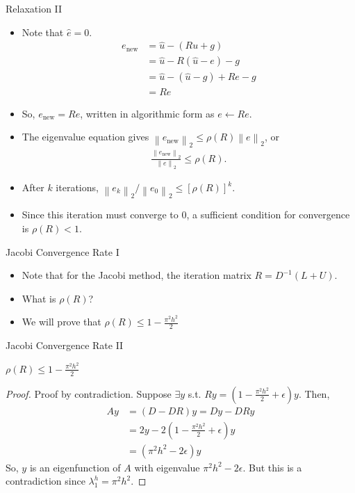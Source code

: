 \documentclass{beamer}
\providecommand{\norm}[1]{\left\lVert #1 \right\rVert}
\begin{document}
\begin{frame}{Relaxation II}
 \begin{itemize}
  \item Note that $\hat{e} = 0$.
  \begin{align}
   e_{\text{new}} &= \hat{u} - (Ru+g) \nonumber \\
                  &= \hat{u} - R(\hat{u}-e) - g \nonumber \\
                  &= \hat{u} - (\hat{u}-g) + Re - g \nonumber \\
                  &= Re
  \end{align}
  \item So, $e_\text{new} = Re$, written in algorithmic form as $e \leftarrow Re$.
  \item The eigenvalue equation gives $\norm{e_\text{new}}_2 \leq \rho(R)\norm{e}_2$, or
  \begin{align}
   \frac{\norm{e_{\text{new}}}_2}{\norm{e}_2} \leq \rho(R).
  \end{align}
  \item After $k$ iterations, $\norm{e_k}_2/\norm{e_0}_2 \leq [\rho(R)]^k$.
  \item Since this iteration must converge to 0, a sufficient condition for
        convergence is $\rho(R) < 1$.
 \end{itemize}
\end{frame}

\begin{frame}{Jacobi Convergence Rate I}
 \begin{itemize}
  \item Note that for the Jacobi method, the iteration matrix $R=D^{-1}(L+U)$.
  \item What is $\rho(R)$?
  \item We will prove that $\rho(R) \leq 1-\frac{\pi^2 h^2}{2}$
 \end{itemize}
\end{frame}

\begin{frame}{Jacobi Convergence Rate II}
 \begin{theorem}
  $\rho(R) \leq 1-\frac{\pi^2 h^2}{2}$
   
  \begin{proof}
   Proof by contradiction. Suppose $\exists y$ s.t. $Ry = (1-\frac{\pi^2 h^2}{2}+\epsilon)y$.
   Then,
   \begin{align}
    Ay &= (D-DR)y = Dy-DRy \nonumber \\
       &= 2y - 2(1-\frac{\pi^2 h^2}{2}+\epsilon)y \nonumber \\
       &= (\pi^2 h^2 - 2 \epsilon) y
   \end{align}
   So, $y$ is an eigenfunction of $A$ with eigenvalue $\pi^2 h^2 - 2 \epsilon$.
   But this is a contradiction since $\lambda^h_1 = \pi^2 h^2$.
  \end{proof}
 \end{theorem}
\end{frame}
\end{document}
